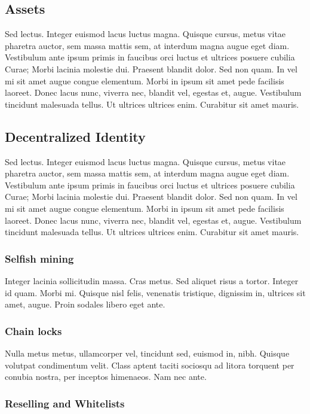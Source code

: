 \documentclass[peerreview]{ieeesyscoin}
\begin{document}
\subsection{Assets}
Sed lectus. Integer euismod lacus luctus magna. Quisque cursus, metus vitae pharetra auctor, sem massa mattis sem, at interdum magna augue eget diam. Vestibulum ante ipsum primis in faucibus orci luctus et ultrices posuere cubilia Curae; Morbi lacinia molestie dui. Praesent blandit dolor. Sed non quam. In vel mi sit amet augue congue elementum. Morbi in ipsum sit amet pede facilisis laoreet. Donec lacus nunc, viverra nec, blandit vel, egestas et, augue. Vestibulum tincidunt malesuada tellus. Ut ultrices ultrices enim. Curabitur sit amet mauris. 

\subsection{Decentralized Identity}
Sed lectus. Integer euismod lacus luctus magna. Quisque cursus, metus vitae pharetra auctor, sem massa mattis sem, at interdum magna augue eget diam. Vestibulum ante ipsum primis in faucibus orci luctus et ultrices posuere cubilia Curae; Morbi lacinia molestie dui. Praesent blandit dolor. Sed non quam. In vel mi sit amet augue congue elementum. Morbi in ipsum sit amet pede facilisis laoreet. Donec lacus nunc, viverra nec, blandit vel, egestas et, augue. Vestibulum tincidunt malesuada tellus. Ut ultrices ultrices enim. Curabitur sit amet mauris. 

\subsubsection{Selfish mining}

Integer lacinia sollicitudin massa. Cras metus. Sed aliquet risus a tortor. Integer id quam. Morbi mi. Quisque nisl felis, venenatis tristique, dignissim in, ultrices sit amet, augue. Proin sodales libero eget ante.

\subsubsection{Chain locks}

Nulla metus metus, ullamcorper vel, tincidunt sed, euismod in, nibh. Quisque volutpat condimentum velit. Class aptent taciti sociosqu ad litora torquent per conubia nostra, per inceptos himenaeos. Nam nec ante. 

\subsubsection{Reselling and Whitelists}
\end{document}
